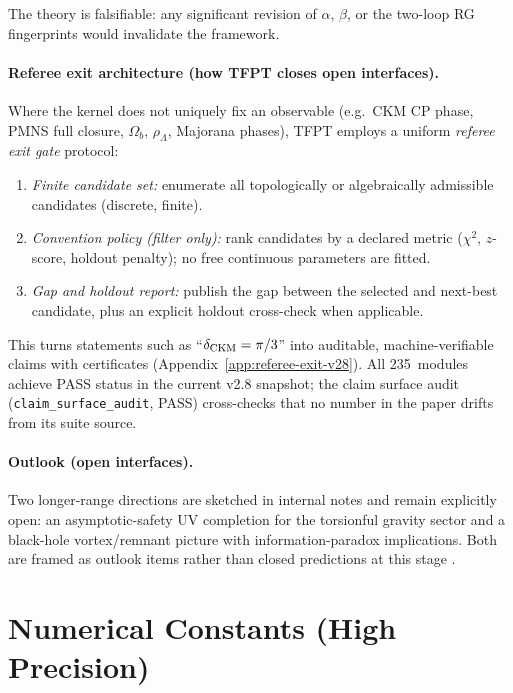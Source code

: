 The theory is falsifiable: any significant revision of $\alpha$, $\beta$, 
or the two-loop RG fingerprints would invalidate the framework.

\paragraph{Referee exit architecture (how TFPT closes open interfaces).}
Where the kernel does not uniquely fix an observable (e.g.\ CKM CP phase, PMNS full closure, $\Omega_b$, $\rho_\Lambda$, Majorana phases), TFPT employs a uniform \emph{referee exit gate} protocol:
\begin{enumerate}[leftmargin=1.5em, topsep=2pt, itemsep=1pt]
    \item \emph{Finite candidate set:} enumerate all topologically or algebraically admissible candidates (discrete, finite).
    \item \emph{Convention policy (filter only):} rank candidates by a declared metric ($\chi^2$, $z$-score, holdout penalty); no free continuous parameters are fitted.
    \item \emph{Gap and holdout report:} publish the gap between the selected and next-best candidate, plus an explicit holdout cross-check when applicable.
\end{enumerate}
This turns statements such as ``$\delta_{\rm CKM}=\pi/3$'' into auditable, machine-verifiable claims with certificates (Appendix~\ref{app:referee-exit-v28}).
All 235~modules achieve PASS status in the current v2.8 snapshot; the claim surface audit (\texttt{claim\_surface\_audit}, PASS) cross-checks that no number in the paper drifts from its suite source.

\paragraph{Outlook (open interfaces).}
Two longer-range directions are sketched in internal notes and remain explicitly open:
an asymptotic-safety UV completion for the torsionful gravity sector and a black-hole
vortex/remnant picture with information-paradox implications. Both are framed as outlook
items rather than closed predictions at this stage \cite{fiveProblemsNote2025,blackHolesBh1Note2025}.

\appendix
\section{Numerical Constants (High Precision)}

